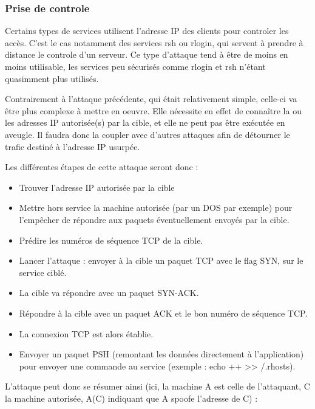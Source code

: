 \subsubsection{Prise de controle}\label{vulnerabilites:reseau:spoofing:ip:control}

Certains types de services utilisent l'adresse IP des clients pour controler les accès. C'est le cas notamment des services rsh ou rlogin, qui servent à prendre à distance le controle d'un serveur. Ce type d'attaque tend à être de moins en moins utilisable, les services peu sécurisés comme rlogin et rsh n'étant quasimment plus utilisés.


Contrairement à l'attaque précédente, qui était relativement simple, celle-ci va être plus complexe à mettre en oeuvre. Elle nécessite en effet de connaître la ou les adresses IP autorisée(s) par la cible, et elle ne peut pas être exécutée en aveugle. Il faudra donc la coupler avec d'autres attaques afin de détourner le trafic destiné à l'adresse IP usurpée.


Les différentes étapes de cette attaque seront donc :

\begin{itemize}
\item Trouver l'adresse IP autorisée par la cible
\item Mettre hors service la machine autorisée (par un DOS par exemple) pour l'empêcher de répondre aux paquets éventuellement envoyés par la cible.
\item Prédire les numéros de séquence TCP de la cible.
\item Lancer l'attaque : envoyer à la cible un paquet TCP avec le flag SYN, sur le service ciblé.
\item La cible va répondre avec un paquet SYN-ACK.
\item Répondre à la cible avec un paquet ACK et le bon numéro de séquence TCP.
\item La connexion TCP est alors établie.
\item Envoyer un paquet PSH (remontant les données directement à l'application) pour envoyer une commande au service (exemple : echo ++ >> /.rhosts).
\end{itemize}
\begin{tabbing}
\end{tabbing}

L'attaque peut donc se résumer ainsi (ici, la machine A est celle de l'attaquant, C la machine autorisée, A(C) indiquant que A spoofe l'adresse de C) :

